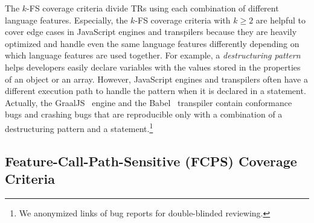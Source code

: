 
The $k$-FS coverage criteria divide TRs using each combination of different
language features.
%
Especially, the $k$-FS coverage criteria with $k \geq 2$ are helpful to cover
edge cases in JavaScript engines and transpilers because they are heavily
optimized and handle even the same language features differently depending on which
language features are used together.
%
For example, a \textit{destructuring pattern} helps developers easily declare
variables with the values stored in the properties of an object or an array.
%
However, JavaScript engines and transpilers often have a different execution
path to handle the pattern when it is declared in a  statement.
%
Actually, the GraalJS~\cite{graaljs} engine and the Babel~\cite{babel}
transpiler contain conformance bugs and crashing bugs that are
reproducible only with a combination of a destructuring pattern and a 
statement.\footnote{
  We anonymized links of bug reports for double-blinded reviewing.
}


\subsection{Feature-Call-Path-Sensitive (FCPS) Coverage
Criteria}\label{sec:fcps-cov}

